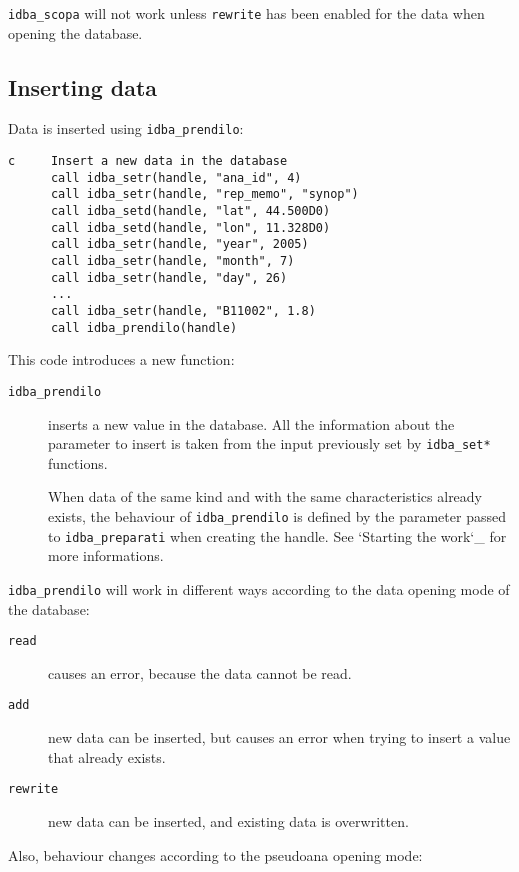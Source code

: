 \documentclass[draft,12pt,a4paper,twoside]{book}
\begin{document}
{\tt idba\_scopa} will not work unless {\tt rewrite} has been enabled for the
data when opening the database.


\subsection {Inserting data}

Data is inserted using {\tt idba\_prendilo}:
\label{fun-idba_prendilo}
         
\begin{verbatim}
c     Insert a new data in the database
      call idba_setr(handle, "ana_id", 4)
      call idba_setr(handle, "rep_memo", "synop")
      call idba_setd(handle, "lat", 44.500D0)
      call idba_setd(handle, "lon", 11.328D0)
      call idba_setr(handle, "year", 2005)
      call idba_setr(handle, "month", 7)
      call idba_setr(handle, "day", 26)
      ...
      call idba_setr(handle, "B11002", 1.8)
      call idba_prendilo(handle)
\end{verbatim}

This code introduces a new function:

\begin{description}
\item[{\tt idba\_prendilo}]
  inserts a new value in the database.  All the information about the parameter
  to insert is taken from the input previously set by {\tt idba\_set*} functions.

  When data of the same kind and with the same characteristics already exists,
  the behaviour of {\tt idba\_prendilo} is defined by the parameter passed to
  {\tt idba\_preparati} when creating the handle.  See `Starting the work`\_ for
  more informations.
\end{description}

{\tt idba\_prendilo} will work in different ways according to the data opening
mode of the database:

\begin{description}
\item[{\tt read}]
  causes an error, because the data cannot be read.
\item[{\tt add}]
  new data can be inserted, but causes an error when trying to insert a value
  that already exists.
\item[{\tt rewrite}]
  new data can be inserted, and existing data is overwritten.
\end{description}

Also, behaviour changes according to the pseudoana opening mode:
\end{document}
